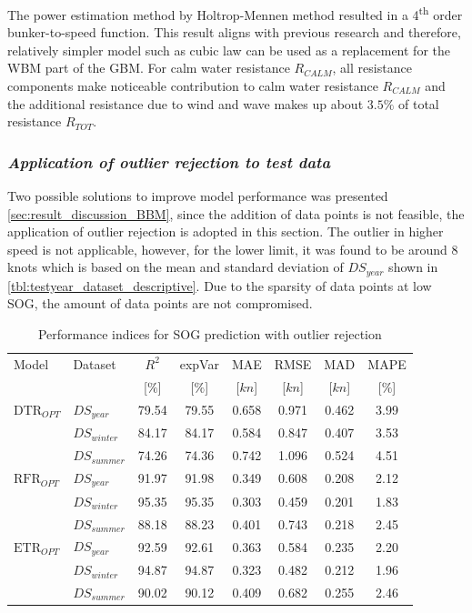 The power estimation method by Holtrop-Mennen method resulted in a 4\textsuperscript{th} order bunker-to-speed function. This result aligns with previous research and therefore, relatively simpler model such as cubic law can be used as a replacement for the WBM part of the GBM. For calm water resistance $R_{CALM}$, all resistance components make noticeable contribution to calm water resistance $R_{CALM}$ and the additional resistance due to wind and wave makes up about $3.5\%$ of total resistance $R_{TOT}$.\\

\subsubsection*{\emph{Application of outlier rejection to test data}}

Two possible solutions to improve model performance was presented \cref{sec:result_discussion_BBM}, since the addition of data points is not feasible, the application of outlier rejection is adopted in this section. The outlier in higher speed is not applicable, however, for the lower limit, it was found to be around 8 knots which is based on the mean and standard deviation of $DS_{year}$ shown in \cref{tbl:testyear_dataset_descriptive}. Due to the sparsity of data points at low SOG, the amount of data points are not compromised.\\
\begin{table}[h!]
    \small
    \centering
    {\begin{tabular}{ l l c c c c c c }
    \hline
    Model & Dataset & $R^2$ & expVar & MAE & RMSE & MAD & MAPE \\
    & & [$\%$] & [$\%$] & [$kn$] & [$kn$] & [$kn$] & [$\%$]  \\ 
    \hline
    $\text{DTR}_{OPT}$ & $DS_{year}$ & 79.54 & 79.55 & 0.658 & 0.971 & 0.462 & 3.99 \\
    & $DS_{winter}$ & 84.17 & 84.17 & 0.584 & 0.847 & 0.407 & 3.53 \\
    & $DS_{summer}$ & 74.26 & 74.36 & 0.742  & 1.096 & 0.524 & 4.51 \\
    $\text{RFR}_{OPT}$ & $DS_{year}$  & 91.97 & 91.98 & 0.349 & 0.608 & 0.208  & 2.12 \\
    & $DS_{winter}$ & 95.35 & 95.35 & 0.303 & 0.459 & 0.201 & 1.83 \\
    & $DS_{summer}$ & 88.18 & 88.23 & 0.401 & 0.743 & 0.218 & 2.45 \\
    $\text{ETR}_{OPT}$ & $DS_{year}$ & 92.59 & 92.61 & 0.363 & 0.584 & 0.235  & 2.20 \\
    & $DS_{winter}$ & 94.87 & 94.87 &  0.323  & 0.482 & 0.212 & 1.96 \\
    & $DS_{summer}$ & 90.02 & 90.12 & 0.409 & 0.682 & 0.255  & 2.46 \\
    \hline
    \end{tabular}}
\caption{Performance indices for SOG prediction with outlier rejection}\label{tbl:sog_scores_errors_rejection}
\end{table}


